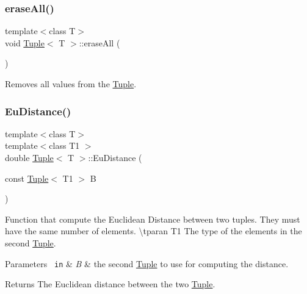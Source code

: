 \subsubsection{\texorpdfstring{eraseAll()}{eraseAll()}}
{\footnotesize\ttfamily template$<$class T$>$ \\
void \mbox{\hyperlink{class_tuple}{Tuple}}$<$ T $>$\+::erase\+All (\begin{DoxyParamCaption}{ }\end{DoxyParamCaption})\hspace{0.3cm}{\ttfamily [inline]}}



Removes all values from the {\ttfamily \mbox{\hyperlink{class_tuple}{Tuple}}}. 

\mbox{\label{class_tuple_a973d6cae203bca0c1ce0d0b65279e433}} 
\subsubsection{\texorpdfstring{EuDistance()}{EuDistance()}}
{\footnotesize\ttfamily template$<$class T$>$ \\
template$<$class T1 $>$ \\
double \mbox{\hyperlink{class_tuple}{Tuple}}$<$ T $>$\+::Eu\+Distance (\begin{DoxyParamCaption}\item[{const \mbox{\hyperlink{class_tuple}{Tuple}}$<$ T1 $>$}]{B }\end{DoxyParamCaption})\hspace{0.3cm}{\ttfamily [inline]}}



Function that compute the Euclidean Distance between two tuples. They must have the same number of elements. \textbackslash{}tparan T1 The type of the elements in the second \mbox{\hyperlink{class_tuple}{Tuple}}. 


\begin{DoxyParams}[1]{Parameters}
\mbox{\texttt{ in}}  & {\em B} & the second \mbox{\hyperlink{class_tuple}{Tuple}} to use for computing the distance. \\
\hline
\end{DoxyParams}
\begin{DoxyReturn}{Returns}
The Euclidean distance between the two \mbox{\hyperlink{class_tuple}{Tuple}}. 
\end{DoxyReturn}
\mbox{\label{class_tuple_aab743167e9fd750f71add11b1aa48f6b}} 
